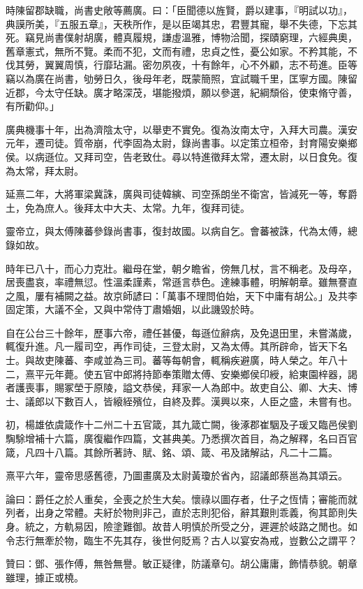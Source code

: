 \begin{pinyinscope}
時陳留郡缺職，尚書史敞等薦廣。曰：「臣聞德以旌賢，爵以建事，『明試以功』，典謨所美，『五服五章』，天秩所作，是以臣竭其忠，君豐其寵，舉不失德，下忘其死。竊見尚書僕射胡廣，體真履規，謙虛溫雅，博物洽聞，探賾窮理，六經典奧，舊章憲式，無所不覽。柔而不犯，文而有禮，忠貞之性，憂公如家。不矜其能，不伐其勞，翼翼周慎，行靡玷漏。密勿夙夜，十有餘年，心不外顧，志不苟進。臣等竊以為廣在尚書，劬勞日久，後母年老，既蒙簡照，宜試職千里，匡寧方國。陳留近郡，今太守任缺。廣才略深茂，堪能撥煩，願以參選，紀綱頹俗，使束脩守善，有所勸仰。」

廣典機事十年，出為濟陰太守，以舉吏不實免。復為汝南太守，入拜大司農。漢安元年，遷司徒。質帝崩，代李固為太尉，錄尚書事。以定策立桓帝，封育陽安樂鄉侯。以病遜位。又拜司空，告老致仕。尋以特進徵拜太常，遷太尉，以日食免。復為太常，拜太尉。

延熹二年，大將軍梁冀誅，廣與司徒韓縯、司空孫朗坐不衛宮，皆減死一等，奪爵土，免為庶人。後拜太中大夫、太常。九年，復拜司徒。

靈帝立，與太傅陳蕃參錄尚書事，復封故國。以病自乞。會蕃被誅，代為太傅，總錄如故。

時年已八十，而心力克壯。繼母在堂，朝夕瞻省，傍無几杖，言不稱老。及母卒，居喪盡哀，率禮無愆。性溫柔謹素，常遜言恭色。達練事體，明解朝章。雖無謇直之風，屢有補闕之益。故京師諺曰：「萬事不理問伯始，天下中庸有胡公。」及共李固定策，大議不全，又與中常侍丁肅婚姻，以此譏毀於時。

自在公台三十餘年，歷事六帝，禮任甚優，每遜位辭病，及免退田里，未嘗滿歲，輒復升進。凡一履司空，再作司徒，三登太尉，又為太傅。其所辟命，皆天下名士。與故吏陳蕃、李咸並為三司。蕃等每朝會，輒稱疾避廣，時人榮之。年八十二，熹平元年薨。使五官中郎將持節奉策贈太傅、安樂鄉侯印綬，給東園梓器，謁者護喪事，賜冢塋于原陵，謚文恭侯，拜家一人為郎中。故吏自公、卿、大夫、博士、議郎以下數百人，皆縗絰殯位，自終及葬。漢興以來，人臣之盛，未嘗有也。

初，楊雄依虞箴作十二州二十五官箴，其九箴亡闕，後涿郡崔駰及子瑗又臨邑侯劉騊駼增補十六篇，廣復繼作四篇，文甚典美。乃悉撰次首目，為之解釋，名曰百官箴，凡四十八篇。其餘所著詩、賦、銘、頌、箴、弔及諸解詁，凡二十二篇。

熹平六年，靈帝思感舊德，乃圖畫廣及太尉黃瓊於省內，詔議郎蔡邕為其頌云。

論曰：爵任之於人重矣，全喪之於生大矣。懷祿以圖存者，仕子之恆情；審能而就列者，出身之常體。夫紆於物則非己，直於志則犯俗，辭其艱則乖義，徇其節則失身。統之，方軌易因，險塗難御。故昔人明慎於所受之分，遲遲於岐路之閒也。如令志行無牽於物，臨生不先其存，後世何貶焉？古人以宴安為戒，豈數公之謂平？

贊曰：鄧、張作傅，無咎無譽。敏正疑律，防議章句。胡公庸庸，飾情恭貌。朝章雖理，據正或橈。


\end{pinyinscope}